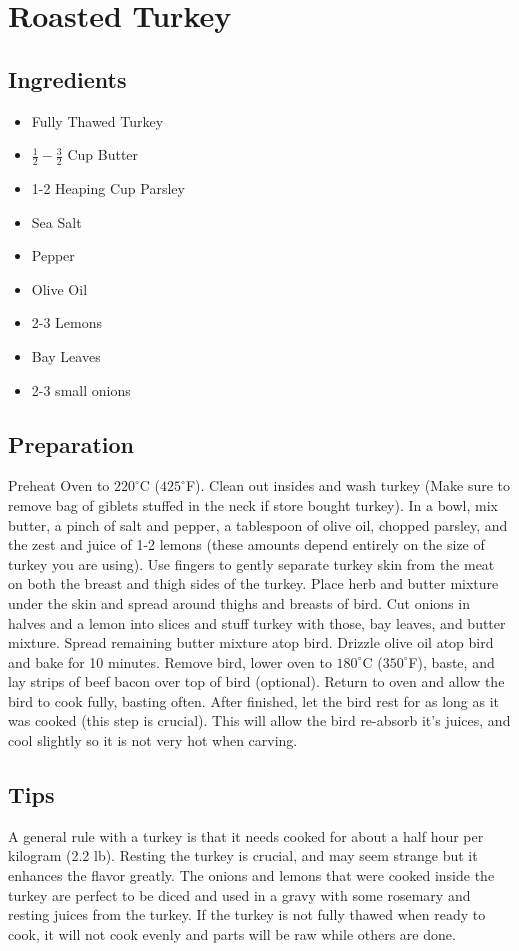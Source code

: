 \thispagestyle{fancy}
\section{Roasted Turkey} \label{roastturkey}
\AddToShipoutPicture*{\RoastTurkey}

\subsection*{Ingredients}

\begin{multicols}{3}
	\begin{itemize}
		\item Fully Thawed Turkey
		\item $\frac{1}{2}-\frac{3}{2}$ Cup Butter
		\item 1-2 Heaping Cup Parsley
		\item Sea Salt
		\item Pepper
		\item Olive Oil
		\item 2-3 Lemons
		\item Bay Leaves
		\item 2-3 small onions
	\end{itemize}
\end{multicols}

\subsection*{Preparation}
	Preheat Oven to $220^\circ$C ($425^\circ$F). Clean out insides and wash turkey (Make sure to remove bag of giblets stuffed in the neck if store bought turkey). In a bowl, mix butter, a pinch of salt and pepper, a tablespoon of olive oil, chopped parsley, and the zest and juice of 1-2 lemons (these amounts depend entirely on the size of turkey you are using). Use fingers to gently separate turkey skin from the meat on both the breast and thigh sides of the turkey. Place herb and butter mixture under the skin and spread around thighs and breasts of bird. Cut onions in halves and a lemon into slices and stuff turkey with those, bay leaves, and butter mixture. Spread remaining butter mixture atop bird. Drizzle olive oil atop bird and bake for 10 minutes. Remove bird, lower oven to $180^\circ$C ($350^\circ$F), baste, and lay strips of beef bacon over top of bird (optional). Return to oven and allow the bird to cook fully, basting often. After finished, let the bird rest for as long as it was cooked (this step is crucial). This will allow the bird re-absorb it's juices, and cool slightly so it is not very hot when carving.
	
\subsection*{Tips}
	A general rule with a turkey is that it needs cooked for about a half hour per kilogram (2.2 lb). Resting the turkey is crucial, and may seem strange but it enhances the flavor greatly. The onions and lemons that were cooked inside the turkey are perfect to be diced and used in a gravy with some rosemary and resting juices from the turkey. If the turkey is not fully thawed when ready to cook, it will not cook evenly and parts will be raw while others are done.
	